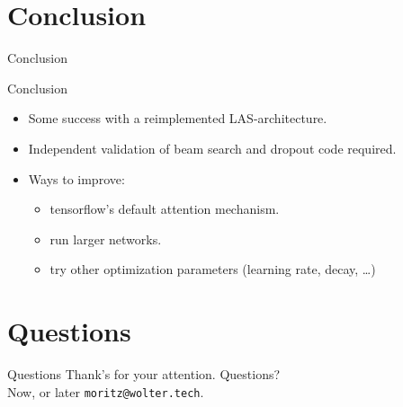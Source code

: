 \documentclass[10pt]{beamer}
\begin{document}
\section{Conclusion}
\begin{frame}{Conclusion}

\begin{table}
\caption{Selected important experiment parameters and test set phoneme error rate.}
\end{table}

\end{frame}

\begin{frame}{Conclusion}
\begin{itemize}
	\item Some success with a reimplemented LAS-architecture.
	\item Independent validation of beam search and dropout code required.
	\item Ways to improve:
		\begin{itemize}
			\item tensorflow's default attention mechanism.
			\item run larger networks.
			\item try other optimization parameters (learning rate, decay, \dots)
		\end{itemize}
\end{itemize}
\end{frame}


\section{Questions}
\begin{frame}{Questions}
	Thank's for your attention. Questions? \\
	Now, or later \texttt{moritz@wolter.tech}.
\end{frame}
\end{document}
